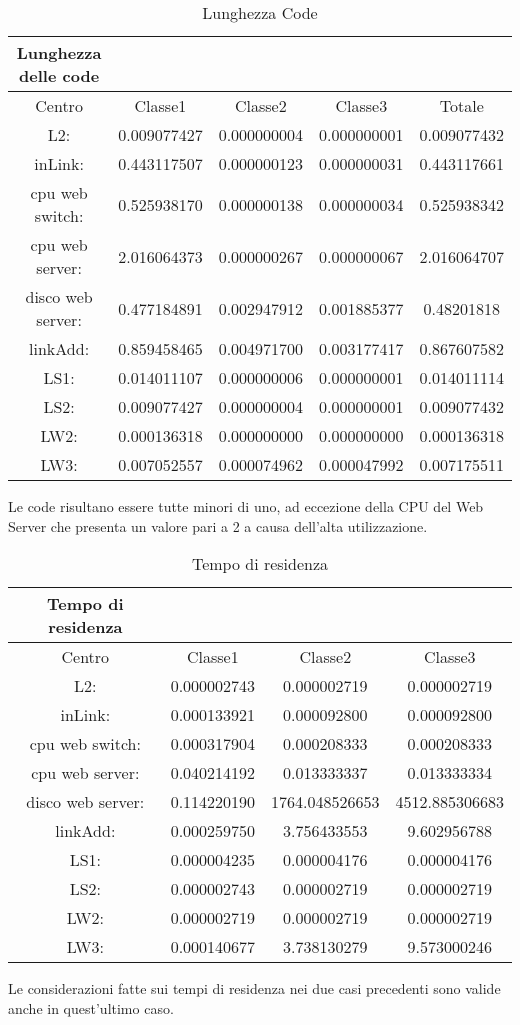 \begin{table}[htbp]
\begin{center}
\begin{tabular}{|c|c|c|c|c|}
\hline
Lunghezza delle code\\
\hline
Centro &Classe1 &Classe2 &Classe3 &Totale\\
\hline
\hline
L2: &0.009077427 &0.000000004 &0.000000001 &0.009077432\\
\hline
inLink: &0.443117507 &0.000000123 &0.000000031 &0.443117661\\
\hline
cpu web switch: &0.525938170 &0.000000138 &0.000000034 &0.525938342\\
\hline
cpu web server: &2.016064373 &0.000000267 &0.000000067 &2.016064707\\
\hline
disco web server: &0.477184891 &0.002947912 &0.001885377 &0.48201818\\
\hline
linkAdd: &0.859458465 &0.004971700 &0.003177417 &0.867607582\\
\hline
LS1: &0.014011107 &0.000000006 &0.000000001 &0.014011114\\
\hline
LS2: &0.009077427 &0.000000004 &0.000000001 &0.009077432\\
\hline
LW2: &0.000136318 &0.000000000 &0.000000000 &0.000136318\\
\hline
LW3: &0.007052557 &0.000074962 &0.000047992 &0.007175511\\
\end{tabular}
\end{center}
\caption{Lunghezza Code}
\label{lunghezzacode}
\end{table}
Le code risultano essere tutte minori di uno, ad eccezione della CPU del Web Server che presenta un valore pari a 2 a causa dell'alta utilizzazione.
\begin{table}[htbp]
\begin{center}
\begin{tabular}{|c|c|c|c|}
\hline
Tempo di residenza\\
\hline
Centro &Classe1 &Classe2 &Classe3\\
\hline
\hline
L2: &0.000002743 &0.000002719 &0.000002719\\
\hline
inLink: &0.000133921 &0.000092800 &0.000092800\\
\hline
cpu web switch: &0.000317904 &0.000208333 &0.000208333\\
\hline
cpu web server: &0.040214192 &0.013333337 &0.013333334\\
\hline
disco web server: &0.114220190 &1764.048526653 &4512.885306683\\
\hline
linkAdd: &0.000259750 &3.756433553 &9.602956788\\
\hline
LS1: &0.000004235 &0.000004176 &0.000004176\\
\hline
LS2: &0.000002743 &0.000002719 &0.000002719\\
\hline
LW2: &0.000002719 &0.000002719 &0.000002719\\
\hline
LW3: &0.000140677 &3.738130279 &9.573000246\\
\hline
\end{tabular}
\end{center}
\caption{Tempo di residenza}
\label{tempodiresidenza}
\end{table}
Le considerazioni fatte sui tempi di residenza nei due casi precedenti sono valide anche in quest'ultimo caso. 
